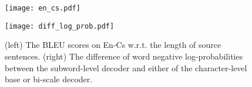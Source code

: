 \documentclass[11pt]{article}
\begin{document}
\begin{figure}[t]
    \begin{minipage}{0.49\columnwidth}
        \centering
        \texttt{[image: en\_cs.pdf]}
    \end{minipage}
    \hfill
    \begin{minipage}{0.49\columnwidth}
        \centering
        \texttt{[image: diff\_log\_prob.pdf]}
    \end{minipage}

    \caption{(left) The BLEU scores on En-Cs w.r.t. the length of source sentences. 
        (right) The difference of word negative log-probabilities
        between the subword-level decoder and either of the character-level base
        or bi-scale decoder. 
    }
    \label{fig:qual1}

\end{figure}
\end{document}
